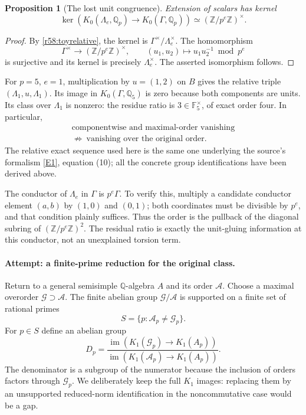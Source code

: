 \documentclass[11pt,a4paper]{article}
\newcommand{\Z}{\mathbb{Z}}
\newcommand{\Q}{\mathbb{Q}}
\newcommand{\F}{\mathbb{F}}
\newcommand{\eref}[2]{\hyperlink{extra:#1:#2}{[E#2]}}
\newtheorem{notebookproposition}[notebooklemma]{Proposition}
\numberwithin{equation}{section}
\begin{document}
\begin{notebookproposition}[The lost unit congruence]\label{r58:kernel}
Extension of scalars has kernel
\[
 \ker\!\left(K_0(\Lambda_e,\Q_p)\longrightarrow
                  K_0(\Gamma,\Q_p)\right)
       \simeq(\Z/p^e\Z)^\times.
\]
\end{notebookproposition}
\begin{proof}
By \eqref{r58:toyrelative}, the kernel is $\Gamma^\times/\Lambda_e^\times$. The homomorphism
\[
 \Gamma^\times\longrightarrow(\Z/p^e\Z)^\times,
 \qquad(u_1,u_2)\longmapsto u_1u_2^{-1}\bmod p^e
\]
is surjective and its kernel is precisely $\Lambda_e^\times$. The asserted isomorphism follows.
\end{proof}

For $p=5$, $e=1$, multiplication by $u=(1,2)$ on $B$ gives the relative triple $(\Lambda_1,u,\Lambda_1)$. Its image in $K_0(\Gamma,\Q_5)$ is zero because both components are units. Its class over $\Lambda_1$ is nonzero: the residue ratio is $3\in\F_5^\times$, of exact order four. In particular,
\begin{equation}\label{r58:falseimplication}
 \begin{gathered}
 \text{componentwise and maximal-order vanishing}\\
 \not\Longrightarrow\ \text{vanishing over the original order}.
 \end{gathered}
\end{equation}
The relative exact sequence used here is the same one underlying the source's formalism \eref{58}{1}, equation (10); all the concrete group identifications have been derived above.

The conductor of $\Lambda_e$ in $\Gamma$ is $p^e\Gamma$. To verify this, multiply a candidate conductor element $(a,b)$ by $(1,0)$ and $(0,1)$; both coordinates must be divisible by $p^e$, and that condition plainly suffices. Thus the order is the pullback of the diagonal subring of $(\Z/p^e\Z)^2$. The residual ratio is exactly the unit-gluing information at this conductor, not an unexplained torsion term.

\paragraph{Attempt: a finite-prime reduction for the original class.}
Return to a general semisimple $\Q$-algebra $A$ and its order $\mathcal A$. Choose a maximal overorder $\mathcal G\supset\mathcal A$. The finite abelian group $\mathcal G/\mathcal A$ is supported on a finite set of rational primes
\[
 S=\{p:\mathcal A_p\ne\mathcal G_p\}.
\]
For $p\in S$ define an abelian group
\begin{equation}\label{r58:residual}
 D_p=\frac{\operatorname{im}(K_1(\mathcal G_p)\to K_1(A_p))}
           {\operatorname{im}(K_1(\mathcal A_p)\to K_1(A_p))}.
\end{equation}
The denominator is a subgroup of the numerator because the inclusion of orders factors through $\mathcal G_p$. We deliberately keep the full $K_1$ images: replacing them by an unsupported reduced-norm identification in the noncommutative case would be a gap.
\end{document}
